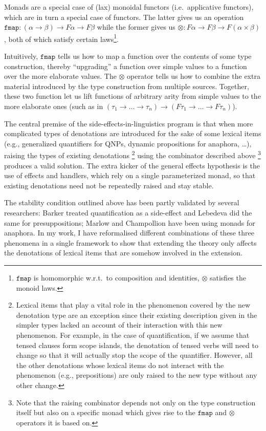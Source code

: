 \documentclass[a4paper,11pt,DIV=12]{scrartcl}
\begin{document}
Monads are a special case of (lax) monoidal functors (i.e.\ applicative
functors), which are in turn a special case of functors. The latter gives
us an operation $\texttt{fmap} : (\alpha \to \beta) \to F \alpha \to F
\beta$ while the former gives us $\otimes : F \alpha \to F \beta \to F
(\alpha \times \beta)$, both of which satisfy certain
laws\footnote{$\texttt{fmap}$ is homomorphic w.r.t.\ to composition and
  identities, $\otimes$ satisfies the monoid laws.}.

Intuitively, $\texttt{fmap}$ tells us how to map a function over the
contents of some type construction, thereby ``upgrading'' a function over
simple values to a function over the more elaborate values. The $\otimes$
operator tells us how to combine the extra material introduced by the type
construction from multiple sources. Together, these two function let us
lift functions of arbitrary arity from simple values to the more elaborate
ones (such as in $(\tau_1 \to \ldots \to \tau_n) \to (F \tau_1 \to \ldots
\to F \tau_n)$).

The central premise of the side-effects-in-linguistics program is that when
more complicated types of denotations are introduced for the sake of some
lexical items (e.g., generalized quantifiers for QNPs, dynamic propositions
for anaphora, \ldots), raising the types of existing
denotations \footnote{Lexical items that play a vital role in the
  phenomenon covered by the new denotation type are an exception since
  their existing description given in the simpler types lacked an account
  of their interaction with this new phenomenon. For example, in the case
  of quantification, if we assume that tensed clauses form scope islands,
  the denotation of tensed verbs will need to change so that it will
  actually stop the scope of the quantifier. However, all the other
  denotations whose lexical items do not interact with the phenomenon
  (e.g., prepositions) are only raised to the new type without any other
  change.} using the combinator described above \footnote{Note that the
  raising combinator depends not only on the type construction itself but
  also on a specific monad which gives rise to the $\texttt{fmap}$ and
  $\otimes$ operators it is based on.} produces a valid solution. The extra
kicker of the general effects hypothesis is the use of effects and
handlers, which rely on a single parameterized monad, so that existing
denotations need not be repeatedly raised and stay stable.

The stability condition outlined above has been partly validated by several
researchers: Barker treated quantification as a side-effect and Lebedeva
did the same for presuppositions; Marlow and Champollion have been using
monads for anaphora. In my work, I have reformalised different combinations
of these three phenomena in a single framework to show that extending the
theory only affects the denotations of lexical items that are somehow
involved in the extension.
\end{document}
